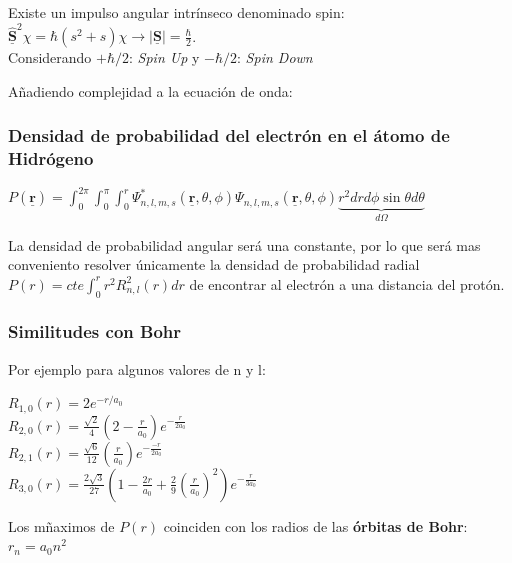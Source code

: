 \documentclass[oneside]{book}
\numberwithin{equation}{section}
\numberwithin{figure}{section}
\numberwithin{table}{section}
\newcommand{\vect}[1]{\underline{\textbf{#1}}}
\begin{document}
					Existe un impulso angular intrínseco denominado spin: $\hat{\vect{S}}^2 \chi=\hbar(s^2+s)\chi \longrightarrow \vert \vect{S} \vert=\frac{\hbar}{2}$.\\
					
					Considerando $+\hbar/2$: \textit{Spin Up} y $-\hbar/2$: \textit{Spin Down}
					
					Añadiendo complejidad a la ecuación de onda: \boxed{\Psi_{n,l,m,s}(\vect{r},\theta,\phi)=R_{n,l}(\vect{r}) Y_{l,m}(\theta,\phi)\chi_s}
					
				\subsubsection{Densidad de probabilidad del electrón en el átomo de Hidrógeno}
					
					$P(\vect{r})=\int_0^{2\pi}\int_0^{\pi}\int_0^{r} \Psi^*_{n,l,m,s}(\vect{r},\theta,\phi)\Psi_{n,l,m,s}(\vect{r},\theta,\phi) \underbrace{r^2 dr d\phi \sin \theta d\theta}_{d\Omega}$
					
					La densidad de probabilidad angular será una constante, por lo que será mas conveniento resolver únicamente la densidad de probabilidad radial $P(r)=cte\int_0^r r^2 R_{n,l}^2(r) dr$ de encontrar al electrón a una distancia del protón.
					
				\subsubsection{Similitudes con Bohr}				
					
					Por ejemplo para algunos valores de n y l:				
					
					\begin{center}
						$R_{1,0}(r)=2 e^{-r/a_0}$\\
						
						$R_{2,0}(r)=\frac{\sqrt{2}}{4}\left(2-\frac{r}{a_0}\right) e^{-\frac{r}{2a_0}}$\\
						
						$R_{2,1}(r)=\frac{\sqrt{6}}{12}\left(\frac{r}{a_0}\right)e^{-\frac{-r}{2a_0}}$\\
						
						$R_{3,0}(r)=\frac{2\sqrt{3}}{27}\left(1-\frac{2r}{a_0}+\frac{2}{9}\left(\frac{r}{a_0}\right)^2\right)e^{-\frac{r}{3a_0}}$\\
					\end{center}
					
					Los mñaximos de $P(r)$ coinciden con los radios de las \textbf{órbitas de Bohr}: $r_n=a_0 n^2$
		
\end{document}
